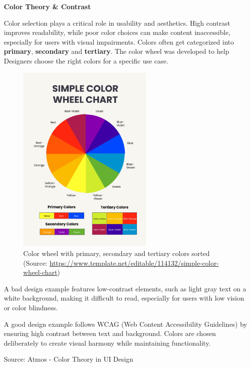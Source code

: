\blankLine

\textbf{Color Theory \& Contrast}

Color selection plays a critical role in usability and aesthetics. High contrast improves readability, while poor color choices can make content inaccessible, especially for users with visual impairments. Colors often get categorized into \textbf{primary}, \textbf{secondary} and \textbf{tertiary}. The color wheel was developed to help Designers choose the right colors for a specific use case. 

\begin{figure} [H]
    \center
    \includegraphics [width=0.6\textwidth] {images/paul/colorWheel.jpg}
    \caption{Color wheel with primary, secondary and tertiary colors sorted (Source: \url{https://www.template.net/editable/114132/simple-color-wheel-chart})}
\end{figure}

\blankLine


A bad design example features low-contrast elements, such as light gray text on a white background, making it difficult to read, especially for users with low vision or color blindness.

A good design example follows WCAG (Web Content Accessibility Guidelines) by ensuring high contrast between text and background. Colors are chosen deliberately to create visual harmony while maintaining functionality.

Source: Atmos - Color Theory in UI Design

